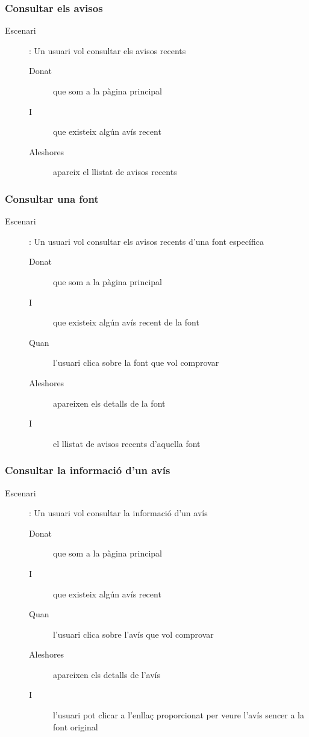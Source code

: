 \documentclass{article}
\begin{document}
\subsubsection{Consultar els avisos}

\begin{description}
    \item[Escenari]: Un usuari vol consultar els avisos recents
    \begin{description}
        \item[Donat] que som a la pàgina principal
        \item[I] que existeix algún avís recent
        \item[Aleshores] apareix el llistat de avisos recents
    \end{description}
\end{description}

\subsubsection{Consultar una font}

\begin{description}
    \item[Escenari]: Un usuari vol consultar els avisos recents d'una font específica
    \begin{description}
        \item[Donat] que som a la pàgina principal
        \item[I] que existeix algún avís recent de la font
        \item[Quan] l'usuari clica sobre la font que vol comprovar
        \item[Aleshores] apareixen els detalls de la font
        \item[I] el llistat de avisos recents d'aquella font
    \end{description}
\end{description}

\subsubsection{Consultar la informació d'un avís}

\begin{description}
    \item[Escenari]: Un usuari vol consultar la informació d'un avís
    \begin{description}
        \item[Donat] que som a la pàgina principal
        \item[I] que existeix algún avís recent
        \item[Quan] l'usuari clica sobre l'avís que vol comprovar
        \item[Aleshores] apareixen els detalls de l'avís
        \item[I] l'usuari pot clicar a l'enllaç proporcionat per veure l'avís sencer a la font original
    \end{description}
\end{description}
\end{document}

